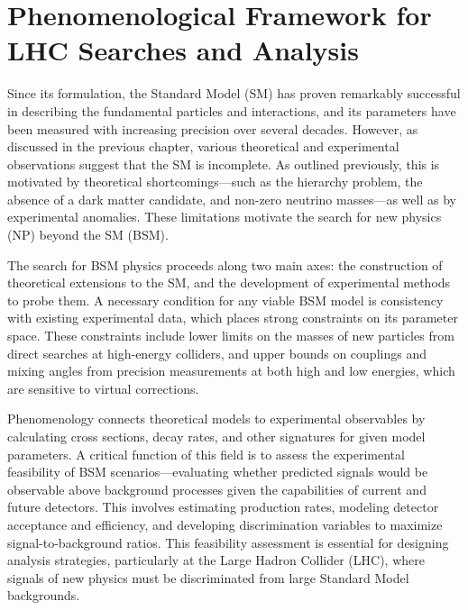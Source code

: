 \chapter[Phenomenological Framework]{Phenomenological Framework for LHC Searches and Analysis}

Since its formulation, the Standard Model (SM) has proven remarkably successful in describing the fundamental particles and interactions, and its parameters have been measured with increasing precision over several decades. However, as discussed in the previous chapter, various theoretical and experimental observations suggest that the SM is incomplete. As outlined previously, this is motivated by theoretical shortcomings—such as the hierarchy problem, the absence of a dark matter candidate, and non-zero neutrino masses—as well as by experimental anomalies. These limitations motivate the search for new physics (NP) beyond the SM (BSM).

The search for BSM physics proceeds along two main axes: the construction of theoretical extensions to the SM, and the development of experimental methods to probe them. A necessary condition for any viable BSM model is consistency with existing experimental data, which places strong constraints on its parameter space. These constraints include lower limits on the masses of new particles from direct searches at high-energy colliders, and upper bounds on couplings and mixing angles from precision measurements at both high and low energies, which are sensitive to virtual corrections.

Phenomenology connects theoretical models to experimental observables by calculating cross sections, decay rates, and other signatures for given model parameters. A critical function of this field is to assess the experimental feasibility of BSM scenarios—evaluating whether predicted signals would be observable above background processes given the capabilities of current and future detectors. This involves estimating production rates, modeling detector acceptance and efficiency, and developing discrimination variables to maximize signal-to-background ratios. This feasibility assessment is essential for designing analysis strategies, particularly at the Large Hadron Collider (LHC), where signals of new physics must be discriminated from large Standard Model backgrounds.

